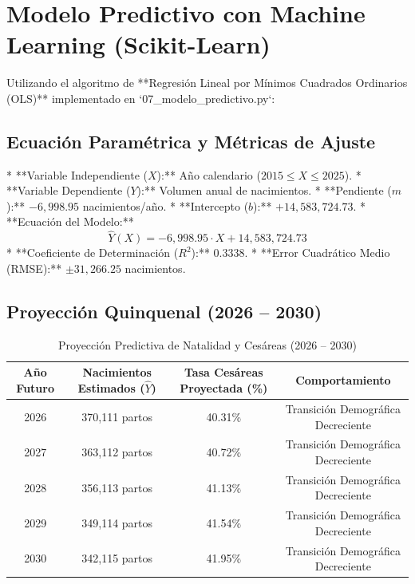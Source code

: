 \documentclass[12pt,a4paper]{article}
\begin{document}
\section{Modelo Predictivo con Machine Learning (Scikit-Learn)}

Utilizando el algoritmo de **Regresión Lineal por Mínimos Cuadrados Ordinarios (OLS)** implementado en `07_modelo_predictivo.py`:

\subsection{Ecuación Paramétrica y Métricas de Ajuste}
* **Variable Independiente ($X$):** Año calendario ($2015 \le X \le 2025$).
* **Variable Dependiente ($Y$):** Volumen anual de nacimientos.
* **Pendiente ($m$):** $-6,998.95$ nacimientos/año.
* **Intercepto ($b$):** $+14,583,724.73$.
* **Ecuación del Modelo:**
  $$\hat{Y}(X) = -6,998.95 \cdot X + 14,583,724.73$$
* **Coeficiente de Determinación ($R^2$):** $0.3338$.
* **Error Cuadrático Medio (RMSE):** $\pm 31,266.25$ nacimientos.

\subsection{Proyección Quinquenal (2026 – 2030)}

\begin{table}[H]
\centering
\small
\caption{Proyección Predictiva de Natalidad y Cesáreas (2026 – 2030)}
\begin{tabular}{cccc}
\toprule
\textbf{Año Futuro} & \textbf{Nacimientos Estimados ($\hat{Y}$)} & \textbf{Tasa Cesáreas Proyectada (\%)} & \textbf{Comportamiento} \\
\midrule
2026 & 370,111 partos & 40.31\% & Transición Demográfica Decreciente \\
2027 & 363,112 partos & 40.72\% & Transición Demográfica Decreciente \\
2028 & 356,113 partos & 41.13\% & Transición Demográfica Decreciente \\
2029 & 349,114 partos & 41.54\% & Transición Demográfica Decreciente \\
2030 & 342,115 partos & 41.95\% & Transición Demográfica Decreciente \\
\bottomrule
\end{tabular}
\end{table}

\newpage

\end{document}
